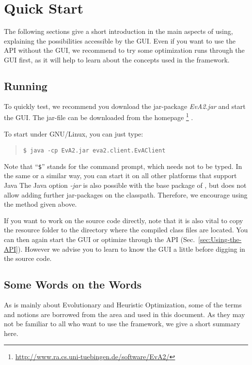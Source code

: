 \chapter{Quick Start\label{sec:Quick-Start}}

The following sections give a short introduction in the main aspects
of using, explaining the possibilities accessible by the
GUI. Even if you want to use the API without the GUI, we recommend
to try some optimization runs through the GUI first, as it will help
to learn about the concepts used in the framework.


\section{Running \label{sub:Quickly-Running-JavaEvA}}

To quickly test, we recommend you download the jar-package
\emph{EvA2.jar} and start the GUI. The jar-file can be downloaded
from the  homepage%
\footnote{\url{http://www.ra.cs.uni-tuebingen.de/software/EvA2/}%
} \cite{EvA2HomePage}.

To start under GNU/Linux, you can just type:
\begin{quotation}
\texttt{\small \$ java -cp EvA2.jar eva2.client.EvAClient}{\small \par}
\end{quotation}
Note that ``\texttt{\$}'' stands for the command prompt, which needs
not to be typed. In the same or a similar way, you can start it on
all other platforms that support Java The Java option \emph{-jar}
is also possible with the base package of , but does not allow adding
further jar-packages on the classpath. Therefore, we encourage using
the method given above.

If you want to work on the source code directly, note that it is also
vital to copy the resource folder to the directory where the compiled
class files are located. You can then again start the GUI or optimize
through the API (Sec.~\ref{sec:Using-the-API}). However we advise
you to learn to know the GUI a little before digging in the source
code.


\section{Some Words on the Words}

As  is mainly about Evolutionary and Heuristic Optimization,
some of the terms and notions are borrowed from the area and used
in this document. As they may not be familiar to all who want to use
the framework, we give a short summary here.

